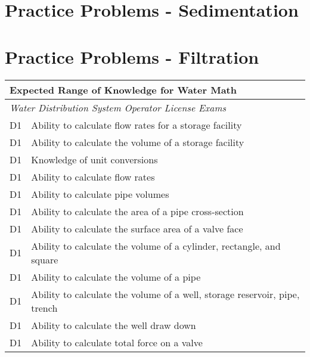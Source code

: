 \section*{Practice Problems - Sedimentation}


\section*{Practice Problems - Filtration}


\begin{table}[H]
\begin{tabular}{| m{1cm} | m{15cm} |}
\hline
\multicolumn{2}{|l|}{\textbf{Expected   Range of Knowledge for Water Math}}                                                                          \\ \hline
\multicolumn{2}{|l|}{\textit{Water   Distribution System Operator License Exams}}                                                                                      \\ \hline
D1 & Ability to   calculate flow rates for a storage facility                     \\ \hline
D1 & Ability to calculate   the volume of a storage facility                      \\ \hline
D1 & Knowledge of unit   conversions                                              \\ \hline
D1 & Ability to calculate   flow rates                                            \\ \hline
D1 & Ability to calculate   pipe volumes                                          \\ \hline
D1 & Ability to calculate   the area of a pipe cross-section                      \\ \hline
D1 & Ability to calculate   the surface area of a valve face                      \\ \hline
D1 & Ability to calculate   the volume of a cylinder, rectangle, and square       \\ \hline
D1 & Ability to calculate   the volume of a pipe                                  \\ \hline
D1 & Ability to calculate   the volume of a well, storage reservoir, pipe, trench \\ \hline
D1 & Ability to calculate   the well draw down                                    \\ \hline
D1 & Ability to calculate   total force on a valve                                \\ \hline

\end{tabular}
\end{table}
